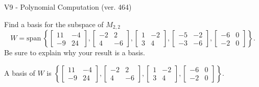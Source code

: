 \begin{exercise}
  \begin{exerciseTitle}V9 - Polynomial Computation (ver. 464)\end{exerciseTitle}
  \begin{exerciseStatement}
    Find a basis for the subspace of \(M_{2,2}\) 
\[W=\mathrm{span}\ \left\{\left[\begin{array}{cc}
11 & -4 \\
-9 & 24
\end{array}\right] , \left[\begin{array}{cc}
-2 & 2 \\
4 & -6
\end{array}\right] , \left[\begin{array}{cc}
1 & -2 \\
3 & 4
\end{array}\right] , \left[\begin{array}{cc}
-5 & -2 \\
-3 & -6
\end{array}\right] , \left[\begin{array}{cc}
-6 & 0 \\
-2 & 0
\end{array}\right]\right\}.\]
 Be sure to explain why your result is a basis.


  \end{exerciseStatement}
  \begin{exerciseAnswer}
   A basis of \(W\) is  \(\left\{\left[\begin{array}{cc}
11 & -4 \\
-9 & 24
\end{array}\right] , \left[\begin{array}{cc}
-2 & 2 \\
4 & -6
\end{array}\right] , \left[\begin{array}{cc}
1 & -2 \\
3 & 4
\end{array}\right] , \left[\begin{array}{cc}
-6 & 0 \\
-2 & 0
\end{array}\right]\right\}\).
  


  \end{exerciseAnswer}
\end{exercise}